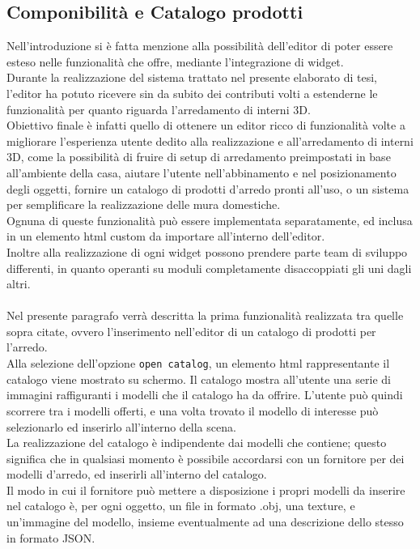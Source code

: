 \subsection{Componibilità e Catalogo prodotti}
\label{sec:chapter_creazione_scena_funzionalita_editor_catalogo}
Nell’introduzione si è fatta menzione alla possibilità dell’editor di poter essere esteso nelle funzionalità che offre, mediante l’integrazione di widget.
\\
Durante la realizzazione del sistema trattato nel presente elaborato di tesi, l’editor ha potuto ricevere sin da subito dei contributi volti a estenderne le funzionalità per quanto riguarda l’arredamento di interni 3D.
\\
Obiettivo finale è infatti quello di ottenere un editor ricco di funzionalità volte a migliorare l’esperienza utente dedito alla realizzazione e all’arredamento di interni 3D, come la possibilità di fruire di setup di arredamento preimpostati in base all’ambiente della casa, aiutare l’utente nell’abbinamento e nel posizionamento degli oggetti, fornire un catalogo di prodotti d’arredo pronti all’uso, o un sistema per semplificare la realizzazione delle mura domestiche.
\\
Ognuna di queste funzionalità può essere implementata separatamente, ed inclusa in un elemento html custom da importare all’interno dell’editor.
\\ 
Inoltre alla realizzazione di ogni widget possono prendere parte team di sviluppo differenti, in quanto operanti su moduli completamente disaccoppiati gli uni dagli altri.
\\
\\
Nel presente paragrafo verrà descritta la prima funzionalità realizzata tra quelle sopra citate, ovvero l’inserimento nell’editor di un catalogo di prodotti per l’arredo. 
\\
Alla selezione dell’opzione \texttt{open catalog}, un elemento html rappresentante il catalogo viene mostrato su schermo. Il catalogo mostra all’utente una serie di immagini raffiguranti i modelli che il catalogo ha da offrire. L’utente può quindi scorrere tra i modelli offerti, e una volta trovato il modello di interesse può selezionarlo ed inserirlo all’interno della scena.
\\
La realizzazione del catalogo è indipendente dai modelli che contiene; questo significa che in qualsiasi momento è possibile accordarsi con un fornitore per dei modelli d’arredo, ed inserirli all’interno del catalogo.
\\ 
Il modo in cui il fornitore può mettere a disposizione i propri modelli da inserire nel catalogo è, per ogni oggetto, un file in formato .obj, una texture, e un’immagine del modello, insieme eventualmente ad una descrizione dello stesso in formato JSON.
